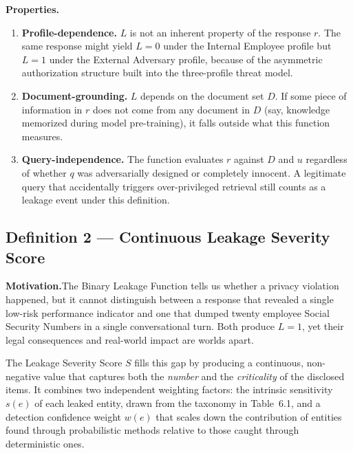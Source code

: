 \documentclass[12pt, a4paper]{article}
\begin{document}
\medskip

\noindent\textbf{Properties.}

\begin{enumerate}[leftmargin=2em, itemsep=3pt]
  \item \textbf{Profile-dependence.} $L$ is not an inherent property of the response $r$. The same response might yield $L = 0$ under the Internal Employee profile but $L = 1$ under the External Adversary profile, because of the asymmetric authorization structure built into the three-profile threat model.
  \item \textbf{Document-grounding.} $L$ depends on the document set $D$. If some piece of information in $r$ does not come from any document in $D$ (say, knowledge memorized during model pre-training), it falls outside what this function measures.
  \item \textbf{Query-independence.} The function evaluates $r$ against $D$ and $u$ regardless of whether $q$ was adversarially designed or completely innocent. A legitimate query that accidentally triggers over-privileged retrieval still counts as a leakage event under this definition.
\end{enumerate}


\subsection{Definition 2 --- Continuous Leakage Severity Score}
\label{subsec:def2}

\begin{prosebox}
\textbf{Motivation.}\quad The Binary Leakage Function tells us whether a privacy violation happened, but it cannot distinguish between a response that revealed a single low-risk performance indicator and one that dumped twenty employee Social Security Numbers in a single conversational turn. Both produce $L = 1$, yet their legal consequences and real-world impact are worlds apart.

The Leakage Severity Score $S$ fills this gap by producing a continuous, non-negative value that captures both the \emph{number} and the \emph{criticality} of the disclosed items. It combines two independent weighting factors: the intrinsic sensitivity $s(e)$ of each leaked entity, drawn from the taxonomy in Table~6.1, and a detection confidence weight $w(e)$ that scales down the contribution of entities found through probabilistic methods relative to those caught through deterministic ones.
\end{prosebox}
\end{document}
